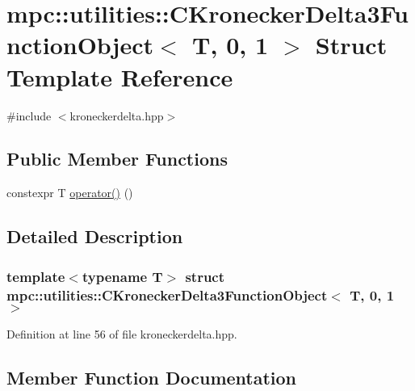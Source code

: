 \hypertarget{structmpc_1_1utilities_1_1_c_kronecker_delta3_function_object_3_01_t_00_010_00_011_01_4}{}\section{mpc\+:\+:utilities\+:\+:C\+Kronecker\+Delta3\+Function\+Object$<$ T, 0, 1 $>$ Struct Template Reference}
\label{structmpc_1_1utilities_1_1_c_kronecker_delta3_function_object_3_01_t_00_010_00_011_01_4}


{\ttfamily \#include $<$kroneckerdelta.\+hpp$>$}

\subsection*{Public Member Functions}
\begin{DoxyCompactItemize}
\item 
constexpr T \mbox{\hyperlink{structmpc_1_1utilities_1_1_c_kronecker_delta3_function_object_3_01_t_00_010_00_011_01_4_a052b1f0010966105f2973dc6f57ff779}{operator()}} ()
\end{DoxyCompactItemize}


\subsection{Detailed Description}
\subsubsection*{template$<$typename T$>$\newline
struct mpc\+::utilities\+::\+C\+Kronecker\+Delta3\+Function\+Object$<$ T, 0, 1 $>$}



Definition at line 56 of file kroneckerdelta.\+hpp.



\subsection{Member Function Documentation}
\mbox{\label{structmpc_1_1utilities_1_1_c_kronecker_delta3_function_object_3_01_t_00_010_00_011_01_4_a052b1f0010966105f2973dc6f57ff779}} 
